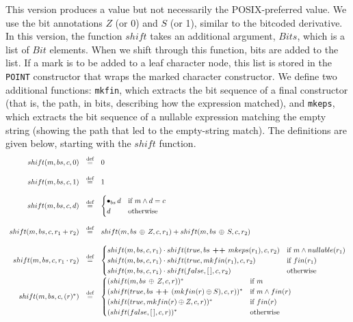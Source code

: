 \documentclass[12pt]{article}
\begin{document}
This version produces a value but not necessarily the POSIX-preferred value. We use the bit annotations $Z$ 
(or 0) and $S$ (or 1), similar to the bitcoded derivative. In this version, the function $shift$ takes an 
additional argument, $Bits$, which is a list of $Bit$ elements. When we shift through this function, bits 
are added to the list. If a mark is to be added to a leaf character node, this list is stored in the 
\texttt{POINT} constructor that wraps the marked character constructor.
We define two additional functions: \texttt{mkfin}, which extracts the bit sequence of a final constructor 
(that is, the path, in bits, describing how the expression matched), and \texttt{mkeps}, which extracts the
 bit sequence of a nullable expression matching the empty string (showing the path that led to the 
 empty-string match). The definitions are given below, starting with the $shift$ function.
\[
\begin{array}{rcl}
  shift(m,bs,c,0)              & \stackrel{\text{def}}{=} & 0 \\\\
  shift(m,bs,c,1)              & \stackrel{\text{def}}{=} & 1 \\\\
  shift(m,bs,c,d)              & \stackrel{\text{def}}{=} & 
   \begin{cases}
    \bullet_{bs} \, d & \text{if  $ m \land d = c $}\\
    d                 & \text{otherwise}
   \end{cases} \\\\

  shift(m,bs,c, r_1 + r_2)     & \stackrel{\text{def}}{=} & shift(m,bs \, \oplus \, Z,c,r_1) + shift(m,bs \, \oplus \, S,c,r_2) \\\\
  
  shift(m,bs,c, r_1 \cdot r_2) & \stackrel{\text{def}}{=} &
  \begin{cases}
      shift(m,bs,c,r_1)  \cdot shift(true,bs \textbf{ ++ } mkeps(r_1),c,r_2) & \text{if $ m \land nullable(r_1) $}\\
      shift(m,bs,c,r_1)  \cdot shift(true,mkfin(r_1),c,r_2)                  & \text{if $ fin(r_1) $}\\
      shift(m,bs,c,r_1)  \cdot shift(false,[\,],c,r_2)                       & \text{otherwise} 
    \end{cases}  \\

  shift(m,bs,c,(r)^*)          & \stackrel{\text{def}}{=} &
    \begin{cases}
      (shift(m,bs \, \oplus \, Z,c,r))^*                & \text{if $ m $} \\
      (shift(true,bs \textbf{ ++ } (mkfin(r) \oplus S),c,r))^* & \text{if \( m \land fin(r) \)} \\
      (shift(true,mkfin(r) \oplus Z,c,r))^* & \text{if \( fin(r) \)} \\
      (shift(false,[\,],c,r))^*           & \text{otherwise}
    \end{cases}
\end{array}
\]
\end{document}

